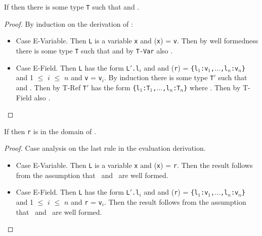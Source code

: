 \begin{Lemma}
\label{lem:valueImpliesType}
If \emph{} then there is some type {\tt T}
such that \emph{} and \emph{}.
\end{Lemma}
\begin{proof}
By induction on the derivation of :
\begin{itemize}
\item Case {\sc E-Variable}.  Then {\tt L} is a variable {\tt x} and 
  \Euid({\tt x}) = {\tt v}.  Then by
  well formedness there is some type {\tt T}
such that  and by {\tt T-Var} also .
\item Case {\sc E-Field}.  Then {\tt L} has the form {\tt L$'$.l$_i$}
  and  and
  \texttt{\Huid}(\texttt{r}) =
  \texttt{\{l$_1$:v$_1$,$\ldots$,l$_n$:v$_n$\}} and
  1 $\leq$ $i$ $\leq$ $n$ and {\tt v} = {\tt v$_i$}.  By induction
  there is some type {\tt T$'$} such that
   and .
  Then by {\sc T-Ref} {\tt T$'$} has the form 
  \texttt{\{l$_1$:T$_1$,$\ldots$,l$_n$:T$_n$\}} where
.  Then by {\sc T-Field} also 
.
\end{itemize}
\end{proof}



\begin{Lemma}
\label{lem:refWellFormed}
If \emph{} then {\tt r} is in the domain of \Huid.
\end{Lemma}
\begin{proof}
Case analysis on the last rule in the evaluation derivation.
\begin{itemize}
\item Case {\sc E-Variable}.  Then {\tt L} is a variable {\tt x} and
  \Euid({\tt x}) = {\tt r}.  Then the result follows from the
  assumption that \Euid\ and \Huid\ are well formed.
\item Case {\sc E-Field}.  Then {\tt L} has the form {\tt L$'$.l$_i$}
  and  and
  \texttt{\Huid}(\texttt{r}) =
  \texttt{\{l$_1$:v$_1$,$\ldots$,l$_n$:v$_n$\}} and
  1 $\leq$ $i$ $\leq$ $n$ and {\tt r} = {\tt v$_i$}.  Then the result
  follows from the assumption that  \Euid\ and \Huid\ are well formed.
\end{itemize}
\end{proof}

